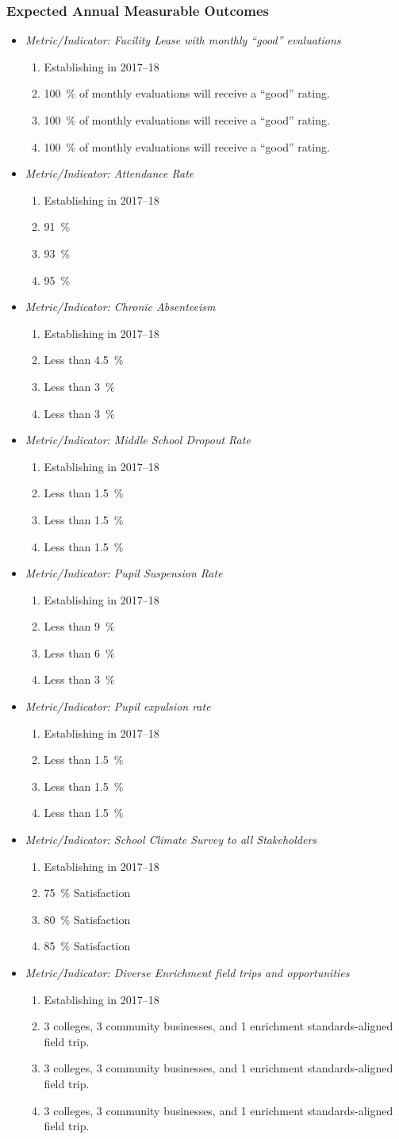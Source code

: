 \documentclass{article}
\makeatletter
\newcounter{goal}[section] %
\newcommand*{\expout}[1]{%
	\expandafter\@expout\csname c@#1\endcsname%
}
\newcommand*{\@expout}[1]{%
	$\ifcase\intcalcAdd{1}{\intcalcMod{\intcalcSub{#1}{1}}{4}}
		\or{\text{Baseline:}}
		\or{\text{2017--18:}}
		\or{\text{2018--19:}}
		\or{\text{2019--20:}}
    \else\@ctrerr\fi$
}
\newcommand{\expoutcome}[5]{
	\item
	{\em Metric/Indicator: #1}
	\begin{enumerate}[label=\expout*]
		\setlength\itemindent{40pt}
		\item #2
		\item #3
		\item #4
		\item #5
	\end{enumerate}
}
\newenvironment{expoutcomes}
	{
		\subsubsection{Expected Annual Measurable Outcomes}
		\begin{itemize}[label={}]
	}
	{\end{itemize}}
\newcounter{action}[goal]
\makeatother
\begin{document}
\begin{expoutcomes}
	\expoutcome
	{Facility Lease with monthly ``good'' evaluations}
	{Establishing in 2017--18}
	{\SI{100}{\percent} of monthly evaluations will receive a ``good'' rating.}
	{\SI{100}{\percent} of monthly evaluations will receive a ``good'' rating.}
	{\SI{100}{\percent} of monthly evaluations will receive a ``good'' rating.}
	\expoutcome
	{Attendance Rate}
	{Establishing in 2017--18}
	{\SI{91}{\percent}}
	{\SI{93}{\percent}}
	{\SI{95}{\percent}}
	\expoutcome
	{Chronic Absenteeism}
	{Establishing in 2017--18}
	{Less than \SI{4.5}{\percent}}
	{Less than \SI{3}{\percent}}
	{Less than \SI{3}{\percent}}
	\expoutcome
	{Middle School Dropout Rate}
	{Establishing in 2017--18}
	{Less than \SI{1.5}{\percent}}
	{Less than \SI{1.5}{\percent}}
	{Less than \SI{1.5}{\percent}}
	\expoutcome
	{Pupil Suspension Rate}
	{Establishing in 2017--18}
	{Less than \SI{9}{\percent}}
	{Less than \SI{6}{\percent}}
	{Less than \SI{3}{\percent}}
	\expoutcome
	{Pupil expulsion rate}
	{Establishing in 2017--18}
	{Less than \SI{1.5}{\percent}}
	{Less than \SI{1.5}{\percent}}
	{Less than \SI{1.5}{\percent}}
	\expoutcome
	{School Climate Survey to all Stakeholders}
	{Establishing in 2017--18}
	{\SI{75}{\percent} Satisfaction}
	{\SI{80}{\percent} Satisfaction}
	{\SI{85}{\percent} Satisfaction}
	\expoutcome
	{Diverse Enrichment field trips and opportunities}
	{Establishing in 2017--18}
	{3 colleges, 3 community businesses, and 1 enrichment standards-aligned field trip.}
	{3 colleges, 3 community businesses, and 1 enrichment standards-aligned field trip.}
	{3 colleges, 3 community businesses, and 1 enrichment standards-aligned field trip.}
\end{expoutcomes}
\end{document}

